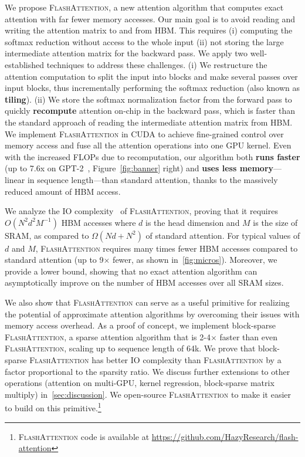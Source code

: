 \documentclass{article}
\newcommand{\sysname}{\textsc{FlashAttention}\xspace}
\begin{document}
We propose \sysname, a new attention algorithm that computes exact attention with far fewer memory accesses.
Our main goal is to avoid reading and writing the attention matrix to and from HBM.
This requires (i) computing the softmax reduction without access to the whole input (ii) not storing the large intermediate attention matrix for the backward pass.
We apply two well-established techniques to address these challenges.
(i) We restructure the attention computation to split the input into blocks and make several passes over input blocks, thus incrementally performing the softmax reduction (also known as \textbf{tiling}). (ii) We store the softmax normalization factor from the forward pass to quickly \textbf{recompute} attention on-chip in the backward pass, which is faster than the standard approach of reading the intermediate attention matrix from HBM.
We implement \sysname in CUDA to achieve fine-grained control over memory access and fuse all the attention operations into one GPU kernel.
Even with the increased FLOPs due to recomputation, our algorithm both \textbf{runs faster} (up to 7.6x on GPT-2~\citep{radford2019language}, Figure~\ref{fig:banner} right) and \textbf{uses less memory}---linear in sequence length---than standard attention, thanks to the massively reduced amount of HBM access.

We analyze the IO complexity~\citep{aggarwal1988input} of \sysname, proving that it requires $O(N^2 d^2 M^{-1})$ HBM accesses where $d$ is the head dimension and $M$ is the size of SRAM, as compared to $\Omega(Nd + N^2)$ of standard attention.
For typical values of $d$ and $M$, \sysname requires many times fewer HBM accesses compared to standard attention (up to 9$\times$ fewer, as shown in~\cref{fig:micros}).
Moreover, we provide a lower bound, showing that no exact attention algorithm can asymptotically improve on the number of HBM accesses over all SRAM sizes.

We also show that \sysname can serve as a 
useful primitive for realizing the potential of approximate attention algorithms by overcoming their issues with memory access overhead.
As a proof of concept, we implement block-sparse \sysname, a sparse attention algorithm that is 2-4$\times$ faster than even \sysname, scaling up to sequence length of 64k.
We prove that block-sparse \sysname has better IO complexity than \sysname by a factor proportional to the sparsity ratio.
We discuss further extensions to other operations (attention on multi-GPU, kernel regression, block-sparse matrix multiply) in~\cref{sec:discussion}.
We open-source \sysname to make it easier to build on this primitive.\footnote{\sysname code is available at \url{https://github.com/HazyResearch/flash-attention}}
\end{document}
